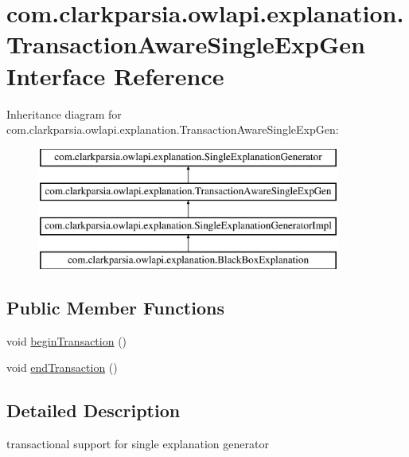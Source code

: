\hypertarget{interfacecom_1_1clarkparsia_1_1owlapi_1_1explanation_1_1_transaction_aware_single_exp_gen}{\section{com.\-clarkparsia.\-owlapi.\-explanation.\-Transaction\-Aware\-Single\-Exp\-Gen Interface Reference}
\label{interfacecom_1_1clarkparsia_1_1owlapi_1_1explanation_1_1_transaction_aware_single_exp_gen}
}
Inheritance diagram for com.\-clarkparsia.\-owlapi.\-explanation.\-Transaction\-Aware\-Single\-Exp\-Gen\-:\begin{figure}[H]
\begin{center}
\leavevmode
\includegraphics[height=4.000000cm]{interfacecom_1_1clarkparsia_1_1owlapi_1_1explanation_1_1_transaction_aware_single_exp_gen}
\end{center}
\end{figure}
\subsection*{Public Member Functions}
\begin{DoxyCompactItemize}
\item 
void \hyperlink{interfacecom_1_1clarkparsia_1_1owlapi_1_1explanation_1_1_transaction_aware_single_exp_gen_a56e8d691b762fe5a9ca7667e2de62010}{begin\-Transaction} ()
\item 
void \hyperlink{interfacecom_1_1clarkparsia_1_1owlapi_1_1explanation_1_1_transaction_aware_single_exp_gen_a5eadf3d1c45d6121b141d10233e2b9cf}{end\-Transaction} ()
\end{DoxyCompactItemize}


\subsection{Detailed Description}
transactional support for single explanation generator 

